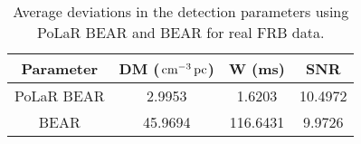 \begin{table}
\centering
\def\arraystretch{1.25}
\caption[Average deviations in the detection parameters for real FRB data]{Average deviations in the detection parameters using PoLaR BEAR and BEAR for real FRB data.}
\begin{tabular}{cccc}
\hline
Parameter & DM ($\,\text{cm}^{-3}\,\text{pc}$) & W (ms) & SNR\\
\hline
PoLaR BEAR & 2.9953  & 1.6203   & 10.4972 \\
BEAR       & 45.9694 & 116.6431 & 9.9726  \\
\hline
\end{tabular}
\label{tab:frbdev}
\end{table}